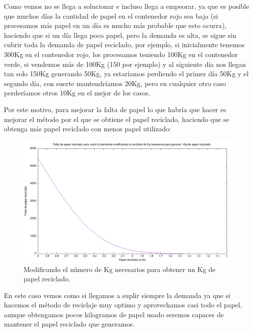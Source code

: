 \documentclass[12pt, spanish]{article}
\begin{document}
Como vemos no se llega a solucionar e incluso llega a empeorar, ya que es posible que muchos días la cantidad de papel en el contenedor rojo sea baja (si procesamos más papel en un día es mucho más probable que esto ocurra), haciendo que si un día llega poco papel, pero la demanda es alta, se sigue sin cubrir toda la demanda de papel reciclado, por ejemplo, si inicialmente tenemos 300Kg en el contenedor rojo, los procesamos teniendo 100Kg en el contenedor verde, si vendemos más de 100Kg (150 por ejemplo) y al siguiente día nos llegan tan solo 150Kg generando 50Kg, ya estaríamos perdiendo el primer día 50Kg y el segundo día, con suerte mantendríamos 20Kg, pero en cualquier otro caso perderíamos otros 10Kg en el mejor de los casos.

Por este motivo, para mejorar la falta de papel lo que habría que hacer es mejorar el método por el que se obtiene el papel reciclado, haciendo que se obtenga más papel reciclado con menos papel utilizado:

\begin{figure}[H]
  \centering
   \includegraphics[width=\textwidth]{falta_papel_cambiando_proporcion_generacion.png}
	\caption{Modificando el número de Kg necesarios para obtener un Kg de papel reciclado.}
\end{figure}


En este caso vemos como si llegamos a suplir siempre la demanda ya que si hacemos el método de reciclaje muy optimo y aprovechamos casi todo el papel, aunque obtengamos pocos kilogramos de papel usado seremos capaces de mantener el papel reciclado que generamos.



%
%
\end{document}
